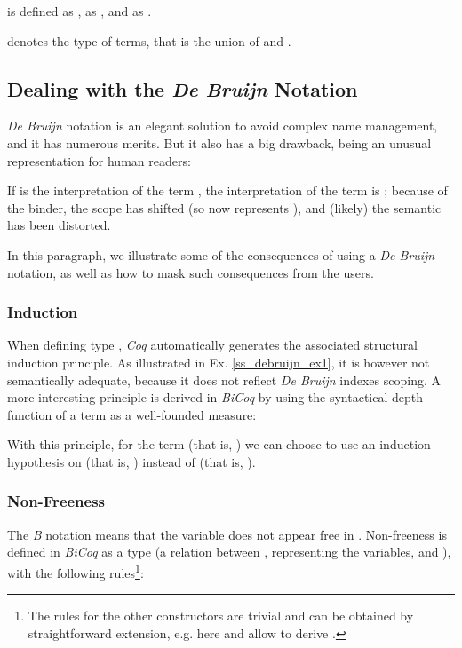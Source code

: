 \documentclass{llncs}
\begin{document}
\begin{notation}\small is defined as ,
 as , and  as .
\end{notation}

\begin{notation}\small denotes the type of terms, that is the union of  and 
.
\end{notation}

\subsection{Dealing with the \emph{De Bruijn} Notation}\label{ss_debruijn}

\emph{De Bruijn} notation is an elegant solution to avoid complex name management, and it has
numerous merits. But it also has a big drawback, being an unusual representation for human 
readers:
\begin{example}\label{ss_debruijn_ex1}
\small If  is the interpretation of the term , the 
interpretation of the term  is ; 
because of the binder, the scope has shifted (so  now represents ), and (likely) 
the semantic has been distorted.
\end{example}
In this paragraph, we illustrate some of the consequences of using a \emph{De Bruijn} notation,
as well as how to mask such consequences from the users.

\subsubsection{Induction} When defining type , \emph{Coq} automatically generates the 
associated structural induction principle. As illustrated in Ex. \ref{ss_debruijn_ex1}, it is 
however not semantically adequate, because it does not reflect \emph{De Bruijn} indexes 
scoping. A more interesting principle is derived in \emph{BiCoq} by using the syntactical 
depth function  of a term as a well-founded measure:

With this principle, for the term  (that is,
) we can choose to use an induction hypothesis on 
 (that is, ) instead of  (that is, 
).

\subsubsection{Non-Freeness} The \emph{B} notation  means that the variable 
 does not appear free in . Non-freeness is defined in \emph{BiCoq} as a type 
 (a relation between , representing the 
variables, and ), with the following rules\footnote{The rules for the other 
constructors are trivial and can be obtained by straightforward extension, e.g. here
 and  allow to derive .}:
\end{document}
